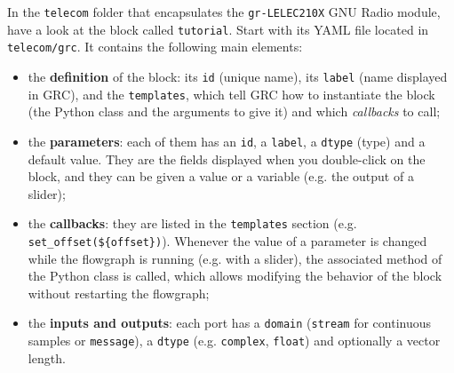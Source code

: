 In the \texttt{telecom} folder that encapsulates the \texttt{gr-LELEC210X} GNU Radio module, have a look at the block called \texttt{tutorial}. Start with its YAML file located in \texttt{telecom/grc}. It contains the following main elements:
\begin{itemize}
    \item the \textbf{definition} of the block: its \texttt{id} (unique name), its \texttt{label} (name displayed in GRC),  and the \texttt{templates}, which tell GRC how to instantiate the block (the Python class and the arguments to give it) and which \emph{callbacks} to call;
    \item the \textbf{parameters}: each of them has an \texttt{id}, a \texttt{label}, a \texttt{dtype} (type) and a default value. They are the fields displayed when you double-click on the block, and they can be given a value or a variable (e.g. the output of a slider);
    \item the \textbf{callbacks}: they are listed in the \texttt{templates} section (e.g. \texttt{set\_offset(\$\{offset\})}). Whenever the value of a parameter is changed while the flowgraph is running (e.g. with a slider), the associated method of the Python class is called, which allows modifying the behavior of the block without restarting the flowgraph;
    \item the \textbf{inputs and outputs}: each port has a \texttt{domain} (\texttt{stream} for continuous samples or \texttt{message}), a \texttt{dtype} (e.g. \texttt{complex}, \texttt{float}) and optionally a vector length.
\end{itemize}

